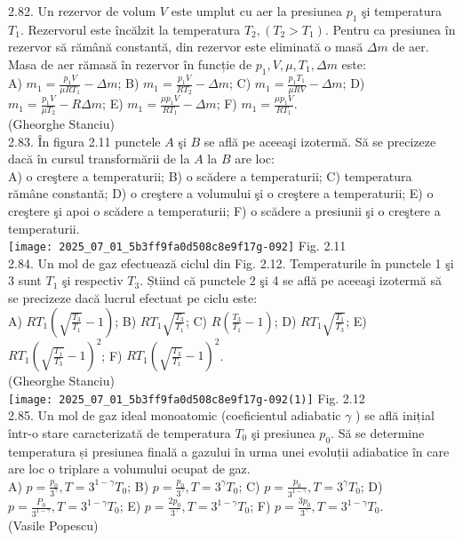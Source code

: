 2.82. Un rezervor de volum $V$ este umplut cu aer la presiunea $p_{1}$ şi temperatura $T_{1}$. Rezervorul este încălzit la temperatura $T_{2},\left(T_{2}>T_{1}\right)$. Pentru ca presiunea în rezervor să rămână constantă, din rezervor este eliminată o masă $\Delta m$ de aer. Masa de aer rămasă în rezervor în funcție de $p_{1}, V, \mu, T_{1}, \Delta m$ este:\\ A) $m_{1}=\frac{p_{1} V}{\mu R T_{1}}-\Delta m$; B) $m_{1}=\frac{p_{1} V}{R T_{2}}-\Delta m$; C) $m_{1}=\frac{p_{1} T_{1}}{\mu R V}-\Delta m$; D) $m_{1}=\frac{p_{1} V}{\mu T_{2}}-R \Delta m$; E) $m_{1}=\frac{\mu p_{1} V}{R T_{1}}-\Delta m$; F) $m_{1}=\frac{\mu p_{1} V}{R T_{1}}$.\\ (Gheorghe Stanciu)\\

2.83. În figura 2.11 punctele $A$ şi $B$ se află pe aceeaşi izotermă. Să se precizeze dacă în cursul transformării de la $A$ la $B$ are loc:\\ A) o creştere a temperaturii; B) o scădere a temperaturii; C) temperatura rămâne constantă; D) o creştere a volumului şi o creştere a temperaturii; E) o creştere şi apoi o scădere a temperaturii; F) o scădere a presiunii şi o creştere a temperaturii.\\ \texttt{[image: 2025\_07\_01\_5b3ff9fa0d508c8e9f17g-092]} Fig. 2.11\\

2.84. Un mol de gaz efectuează ciclul din Fig. 2.12. Temperaturile în punctele 1 şi 3 sunt $T_{1}$ şi respectiv $T_{3}$. Știind că punctele 2 şi 4 se află pe aceeaşi izotermă să se precizeze dacă lucrul efectuat pe ciclu este:\\ A) $R T_{1}\left(\sqrt{\frac{T_{3}}{T_{1}}}-1\right)$; B) $R T_{1} \sqrt{\frac{T_{3}}{T_{1}}}$; C) $R\left(\frac{T_{3}}{T_{1}}-1\right)$; D) $R T_{1} \sqrt{\frac{T_{1}}{T_{3}}}$; E) $R T_{1}\left(\sqrt{\frac{T_{1}}{T_{3}}}-1\right)^{2}$; F) $R T_{1}\left(\sqrt{\frac{T_{3}}{T_{1}}}-1\right)^{2}$.\\ (Gheorghe Stanciu)\\ \texttt{[image: 2025\_07\_01\_5b3ff9fa0d508c8e9f17g-092(1)]} Fig. 2.12\\

2.85. Un mol de gaz ideal monoatomic (coeficientul adiabatic $\gamma$ ) se află inițial într-o stare caracterizată de temperatura $T_{0}$ şi presiunea $p_{0}$. Să se determine temperatura și presiunea finală a gazului în urma unei evoluții adiabatice în care are loc o triplare a volumului ocupat de gaz.\\ A) $p=\frac{p_{0}}{3^{\gamma}}, T=3^{1-\gamma} T_{0}$; B) $p=\frac{p_{0}}{3^{\gamma}}, T=3^{\gamma} T_{0}$; C) $p=\frac{p_{0}}{3^{1-\gamma}}, T=3^{\gamma} T_{0}$; D) $p=\frac{P_{0}}{3^{1-\gamma}}, T=3^{1-\gamma} T_{0}$; E) $p=\frac{2 p_{0}}{3^{\gamma}}, T=3^{1-\gamma} T_{0}$; F) $p=\frac{3 p_{0}}{3^{\gamma}}, T=3^{1-\gamma} T_{0}$.\\ (Vasile Popescu)\\

